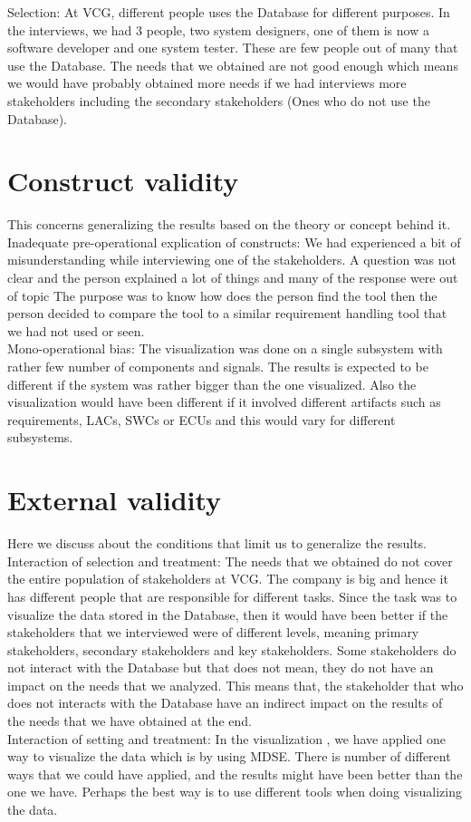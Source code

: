 Selection: At VCG, different people uses the Database for different purposes. In the interviews, we had 3 people, two system designers, one of them is now a software developer and one system tester. These are few people out of many that use the Database. The needs that we obtained are not good enough which means we would have probably obtained more needs if we had interviews more stakeholders including the secondary stakeholders (Ones who do not use the Database).

\section{Construct validity}
This concerns generalizing the results based on the theory or concept behind it.\\

Inadequate pre-operational explication of constructs: We had experienced a bit of misunderstanding while interviewing one of the stakeholders. A question was not clear and the person explained a lot of things and many of the response were out of topic The purpose was to know how does the person find the tool then the person decided to compare the tool to a similar requirement handling tool that we had not used or seen.\\

Mono-operational bias: The visualization was done on a single subsystem with rather few number of components and signals. The results is expected to be different if the system was rather bigger than the one visualized. Also the visualization would have been different if it involved different artifacts such as requirements, LACs, SWCs or ECUs and this would vary for different subsystems.


\section{External validity}
Here we discuss about the conditions that limit us to generalize the results.\\

Interaction of selection and treatment: The needs that we obtained do not cover the entire population of stakeholders at VCG. The company is big and hence it has different people that are responsible for different tasks. Since the task was to visualize the data stored in the Database, then it would have been better if the stakeholders that we interviewed were of different levels, meaning primary stakeholders, secondary stakeholders and key stakeholders. Some stakeholders do not interact with the Database but that does not mean, they do not have an impact on the needs that we analyzed. This means that, the stakeholder that who does not interacts with the Database have an indirect impact on the results of the needs that we have obtained at the end.\\

Interaction of setting and treatment: In the visualization , we have applied one way to visualize the data which is by using MDSE. There is number of different ways that we could have applied, and the results might have been better than the one we have. Perhaps the best way is to use different tools when doing visualizing the data.

